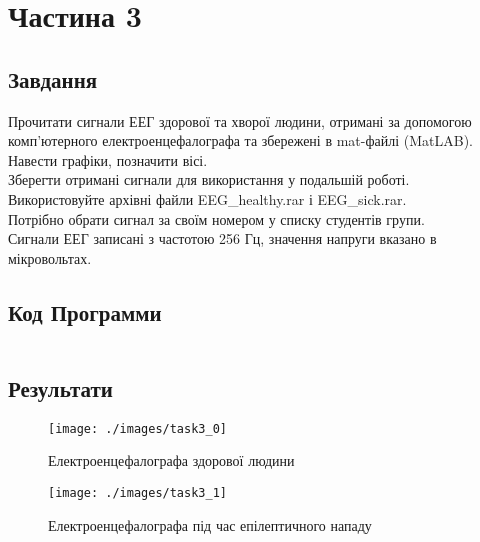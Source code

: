 \section{Частина 3}
\label{sec:task3}

\subsection{Завдання}
\label{subsec:task3_task}

Прочитати сигнали ЕЕГ здорової та хворої людини,
отримані за допомогою комп'ютерного електроенцефалографа
та збережені в mat-файлі (MatLAB). \\
Навести графіки, позначити вісі. \\
Зберегти отримані сигнали для використання у подальшій роботі. \\
Використовуйте архівні файли EEG\_healthy.rar і EEG\_sick.rar. \\
Потрібно обрати сигнал за своїм номером у списку студентів групи. \\
Сигнали ЕЕГ записані з частотою 256 Гц, значення напруги вказано в мікровольтах.

\subsection{Код Программи}
\label{subsec:task3_code}
\inputminted{python}{../src/task3.py}

\subsection{Результати}
\label{subsec:task3_results}

\begin{figure}[!ht]
    \centering
    \texttt{[image: ./images/task3\_0]}
    \caption{Електроенцефалографа здорової людини}
    \label{fig:eeg_healthy}
\end{figure}

\begin{figure}[!ht]
    \centering
    \texttt{[image: ./images/task3\_1]}
    \caption{Електроенцефалографа під час епілептичного нападу}
    \label{fig:eeg_epilepsy}
\end{figure}
